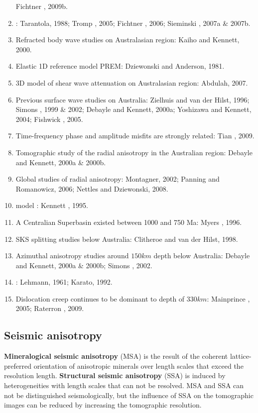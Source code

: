 \begin{enumerate}[\hspace{10mm}*]
    Fichtner \etal, 2009b.
  \item {}: Tarantola, 1988; Tromp \etal, 2005; Fichtner \etal, 2006;
    Sieminski \etal, 2007a \& 2007b.
  \item Refracted body wave studies on Australasian region: Kaiho and Kennett, 2000.
  \item Elastic 1D reference model PREM: Dziewonski and Anderson, 1981.
  \item 3D model of shear wave attenuation on Australasian region: Abdulah, 2007.
  \item Previous surface wave studies on Australia: Zielhuis and van der Hilst, 1996;
    Simons \etal, 1999 \& 2002; Debayle and Kennett, 2000a; Yoshizawa and Kennett, 2004;
    Fishwick \etal, 2005. 
  \item Time-frequency phase and amplitude misfits are strongly related: Tian \etal, 2009.
  \item Tomographic study of the radial anisotropy in the Australian region:
    Debayle and Kennett, 2000a \& 2000b.
  \item Global studies of radial anisotropy: Montagner, 2002; Panning and Romanowicz, 2006;
    Nettles and Dziewonski, 2008.
  \item {} model
    : Kennett \etal, 1995.
  \item A Centralian Superbasin existed between 1000 and 750 Ma: Myers \etal, 1996.
  \item SKS splitting studies below Australia: Clitheroe and van der Hilst, 1998.
  \item Azimuthal anisotropy studies around $150km$ depth below Australia:
    Debayle and Kennett, 2000a \& 2000b; Simons \etal, 2002.
  \item {}: Lehmann, 1961; Karato, 1992.
  \item Dislocation creep continues to be dominant to depth of $330km$:
    Mainprince \etal, 2005; Raterron \etal, 2009.
\end{enumerate}

\subsection{Seismic anisotropy}
\textbf{Mineralogical seismic anisotropy} (MSA)
is the result of the coherent lattice-preferred orientation of anisotropic minerals
over length scales that exceed the resolution length.
\textbf{Structural seismic anisotropy} (SSA)
is induced by heterogeneities with length scales that can not be resolved.
MSA and SSA can not be distinguished seismologically,
but the influence of SSA on the tomographic images can be reduced
by increasing the tomographic resolution.

